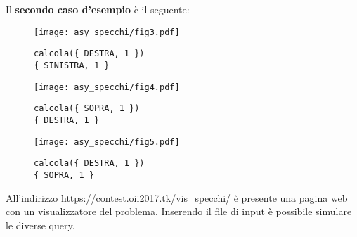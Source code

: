 \pagebreak
Il \textbf{secondo caso d'esempio} è il seguente:

\begin{minipage}{.33\textwidth}
	\begin{figure}[H]
		\centering\texttt{[image: asy\_specchi/fig3.pdf]}
		\caption*{\centering\texttt{calcola(\{ DESTRA, 1 \}) \\ \{ SINISTRA, 1 \}}}
	\end{figure}
\end{minipage}
\begin{minipage}{.33\textwidth}
	\begin{figure}[H]
		\centering\texttt{[image: asy\_specchi/fig4.pdf]}
		\caption*{\centering\texttt{calcola(\{ SOPRA, 1 \}) \\ \{ DESTRA, 1 \}}}
	\end{figure}
\end{minipage}
\begin{minipage}{.33\textwidth}
	\begin{figure}[H]
		\centering\texttt{[image: asy\_specchi/fig5.pdf]}
		\caption*{\centering\texttt{calcola(\{ DESTRA, 1 \}) \\ \{ SOPRA, 1 \}}}
	\end{figure}
\end{minipage}

\Visualizzatore

All'indirizzo \url{https://contest.oii2017.tk/vis\_specchi/} è presente una pagina web con un visualizzatore del problema. Inserendo il file di input è possibile simulare le diverse query.
